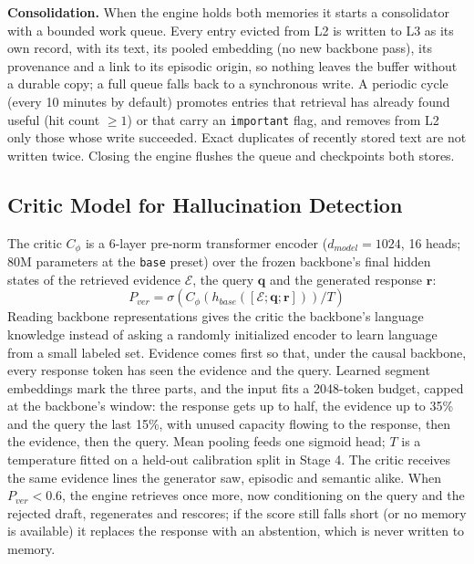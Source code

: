\documentclass{article}
\begin{document}
\textbf{Consolidation.} When the engine holds both memories it starts a consolidator with a bounded work queue. Every entry evicted from L2 is written to L3 as its own record, with its text, its pooled embedding (no new backbone pass), its provenance and a link to its episodic origin, so nothing leaves the buffer without a durable copy; a full queue falls back to a synchronous write. A periodic cycle (every 10 minutes by default) promotes entries that retrieval has already found useful (hit count $\geq 1$) or that carry an \texttt{important} flag, and removes from L2 only those whose write succeeded. Exact duplicates of recently stored text are not written twice. Closing the engine flushes the queue and checkpoints both stores.

\subsection{Critic Model for Hallucination Detection}

The critic $C_\phi$ is a 6-layer pre-norm transformer encoder ($d_{model}=1024$, 16 heads; 80M parameters at the \texttt{base} preset) over the frozen backbone's final hidden states of the retrieved evidence $\mathcal{E}$, the query $\mathbf{q}$ and the generated response $\mathbf{r}$:
\begin{equation}
P_{ver} = \sigma\!\left(C_\phi\!\left(h_{base}([\mathcal{E}; \mathbf{q}; \mathbf{r}])\right) / T\right)
\end{equation}
Reading backbone representations gives the critic the backbone's language knowledge instead of asking a randomly initialized encoder to learn language from a small labeled set. Evidence comes first so that, under the causal backbone, every response token has seen the evidence and the query. Learned segment embeddings mark the three parts, and the input fits a 2048-token budget, capped at the backbone's window: the response gets up to half, the evidence up to 35\% and the query the last 15\%, with unused capacity flowing to the response, then the evidence, then the query. Mean pooling feeds one sigmoid head; $T$ is a temperature fitted on a held-out calibration split in Stage 4. The critic receives the same evidence lines the generator saw, episodic and semantic alike. When $P_{ver} < 0.6$, the engine retrieves once more, now conditioning on the query and the rejected draft, regenerates and rescores; if the score still falls short (or no memory is available) it replaces the response with an abstention, which is never written to memory.
\end{document}
